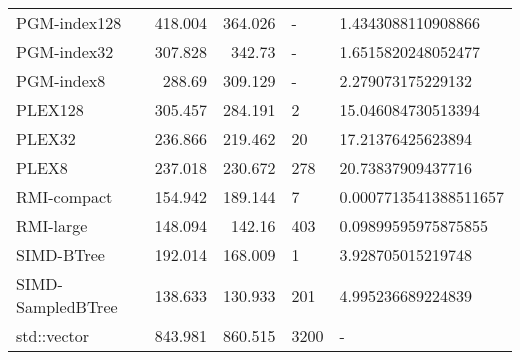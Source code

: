 \begin{tabular}{lrrll}
 PGM-index128      &                418.004 &               364.026 & -            & 1.4343088110908866    \\
 PGM-index32       &                307.828 &               342.73  & -            & 1.6515820248052477    \\
 PGM-index8        &                288.69  &               309.129 & -            & 2.279073175229132     \\
 PLEX128           &                305.457 &               284.191 & 2            & 15.046084730513394    \\
 PLEX32            &                236.866 &               219.462 & 20           & 17.21376425623894     \\
 PLEX8             &                237.018 &               230.672 & 278          & 20.73837909437716     \\
 RMI-compact       &                154.942 &               189.144 & 7            & 0.0007713541388511657 \\
 RMI-large         &                148.094 &               142.16  & 403          & 0.09899595975875855   \\
 SIMD-BTree        &                192.014 &               168.009 & 1            & 3.928705015219748     \\
 SIMD-SampledBTree &                138.633 &               130.933 & 201          & 4.995236689224839     \\
 std::vector       &                843.981 &               860.515 & 3200         & -                     \\
\hline
\end{tabular}